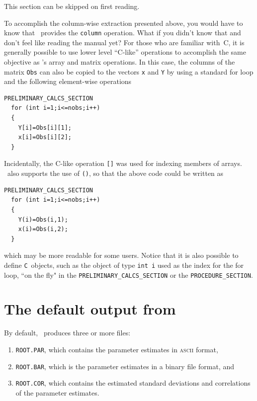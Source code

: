 \documentclass{admbmanual}
\begin{document}
This section can be skipped on first reading.

To accomplish the column-wise extraction presented above, 
you would have to know that
\scAD\ provides the \texttt{column} operation. What if you didn't
know that and don't feel like reading the manual yet?
For those who are familiar with~C, 
 it is generally possible to use lower level ``C-like'' operations
to accomplish the same objective as \scAD's array and matrix operations.
In this case, the columns of the matrix \texttt{Obs} can also be
copied to the vectors \texttt{x} and \texttt{Y} by
using a standard for loop and the following element-wise operations
\begin{lstlisting}
PRELIMINARY_CALCS_SECTION
  for (int i=1;i<=nobs;i++)
  {
    Y[i]=Obs[i][1];
    x[i]=Obs[i][2];
  }
\end{lstlisting}
Incidentally, the C-like operation \texttt{[]} was used
for indexing members of arrays. \ADM\ also supports 
the use of \texttt{()}, so that the above code could be written as
\begin{lstlisting}
PRELIMINARY_CALCS_SECTION
  for (int i=1;i<=nobs;i++)
  {
    Y(i)=Obs(i,1);
    x(i)=Obs(i,2);
  }
\end{lstlisting}
which may be more readable for some users.
Notice that it is also possible to define \texttt{C}~objects,
such as the object of type \texttt{int i} used as the index for the 
for loop, ``on the fly" in the
\texttt{PRELIMINARY\_CALCS\_SECTION} or the \texttt{PROCEDURE\_SECTION}.


\section{The default output from \ADM}

By default, \ADM\ produces three or more files: 
\begin{enumerate}
\item \texttt{ROOT.PAR}, which contains the parameter
estimates in \textsc{ascii} format,

\item \texttt{ROOT.BAR}, which is the parameter estimates in a binary file format,
and

\item \texttt{ROOT.COR}, which contains the estimated standard
deviations and correlations of the parameter estimates.
\end{enumerate}
\end{document}

